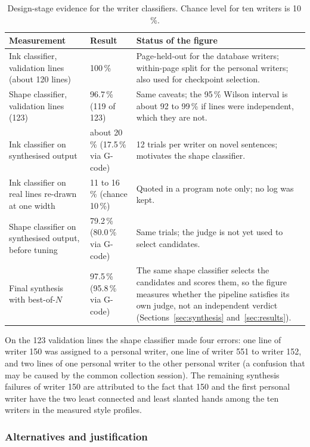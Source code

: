 \begin{table}[h]
\centering
\fontsize{9.5}{11.5}\selectfont
\begin{tabularx}{\linewidth}{|p{4.2cm}|p{2.5cm}|X|}
\hline
\textbf{Measurement} & \textbf{Result} & \textbf{Status of the figure} \\
\hline
Ink classifier, validation lines (about 120 lines) & 100\,\% & Page-held-out for the database writers; within-page split for the personal writers; also used for checkpoint selection. \\
\hline
Shape classifier, validation lines (123) & 96.7\,\% (119 of 123) & Same caveats; the 95\,\% Wilson interval is about 92 to 99\,\% if lines were independent, which they are not. \\
\hline
Ink classifier on synthesised output & about 20\,\% (17.5\,\% via G-code) & 12 trials per writer on novel sentences; motivates the shape classifier. \\
\hline
Ink classifier on real lines re-drawn at one width & 11 to 16\,\% (chance 10\,\%) & Quoted in a program note only; no log was kept. \\
\hline
Shape classifier on synthesised output, before tuning & 79.2\,\% (80.0\,\% via G-code) & Same trials; the judge is not yet used to select candidates. \\
\hline
Final synthesis with best-of-$N$ & 97.5\,\% (95.8\,\% via G-code) & The same shape classifier selects the candidates and scores them, so the figure measures whether the pipeline satisfies its own judge, not an independent verdict (Sections~\ref{sec:synthesis} and~\ref{sec:results}). \\
\hline
\end{tabularx}
\caption{Design-stage evidence for the writer classifiers. Chance level for ten writers is 10\,\%.}
\label{tab:wid-results}
\end{table}

On the 123 validation lines the shape classifier made four errors: one line of writer 150 was assigned to a personal writer, one line of writer 551 to writer 152, and two lines of one personal writer to the other personal writer (a confusion that may be caused by the common collection session).
The remaining synthesis failures of writer 150 are attributed to the fact that 150 and the first personal writer have the two least connected and least slanted hands among the ten writers in the measured style profiles.

\subsubsection{Alternatives and justification}

